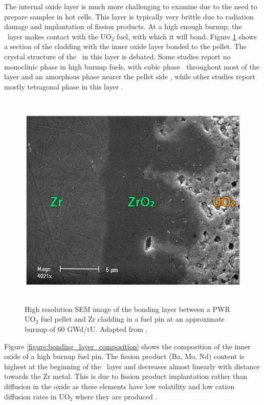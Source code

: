 The internal oxide layer is much more challenging to examine due to the need to prepare samples in hot cells. This layer is typically very brittle due to radiation damage and implantation of fission products. At a high enough burnup, the \zirconia\ layer makes contact with the UO$_{2}$ fuel, with which it will bond. Figure \ref{figure:inner_oxide} shows a section of the cladding with the inner oxide layer bonded to the pellet. The crystal structure of the \zirconia\ in this layer is debated. Some studies report no monoclinic phase in high burnup fuels, with cubic phase \zirconia\ throughout most of the layer and an amorphous phase nearer the pellet side \cite{Nogita1997}, while other studies report mostly tetragonal phase in this layer \cite{ciszak2017etude, gibert1998influence}. 

\begin{figure}[ht] %
\centering
\includegraphics[height=10.5cm]{images/pci_bondinglayer.png}
\caption[High resolution scanning electron microscrope (SEM) image of the bonding layer between a PWR UO$_{2}$ fuel pellet and Zr cladding in a fuel pin at an approximate burnup of 60 GWd/t U.]{High resolution SEM image of the bonding layer between a PWR UO$_{2}$ fuel pellet and Zr cladding in a fuel pin at an approximate burnup of 60 GWd/tU. Adapted from \cite{Lozano1998}.}
\label{figure:inner_oxide}
\end{figure}

Figure \ref{figure:bonding_layer_composition} shows the composition of the inner oxide of a high burnup fuel pin. The fission product (Ba, Mo, Nd) content is highest at the beginning of the \zirconia\ layer and decreases almost linearly with distance towards the Zr metal. This is due to fission product implantation rather than diffusion in the oxide as these elements have low volatility and low cation diffusion rates in UO$_{2}$ where they are produced \cite{S.G.PrussinD.R.OlanderP.Goubeault1984, Prussin1988}. %

